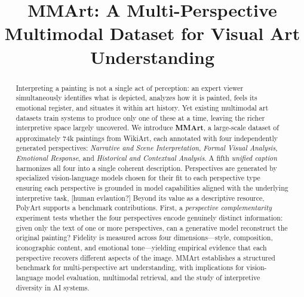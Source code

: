 \documentclass[sigconf,review,anonymous]{acmart}
\begin{document}
\title{MMArt: A Multi-Perspective Multimodal Dataset for Visual Art Understanding}

%




\renewcommand{\shortauthors}{Shuai Wang et al.}



\begin{abstract}
Interpreting a painting is not a single act of perception: an expert viewer simultaneously identifies what is depicted, analyzes how it is painted, feels its emotional register, and situates it within art history. Yet existing multimodal art datasets train systems to produce only one of these at a time, leaving the richer interpretive space largely uncovered. We introduce \textbf{MMArt}, a large-scale dataset of approximately 74k paintings from WikiArt, each annotated with four independently generated perspectives: \emph{Narrative and Scene Interpretation}, \emph{Formal Visual Analysis}, \emph{Emotional Response}, and \emph{Historical and Contextual Analysis}. A fifth \emph{unified caption} harmonizes all four into a single coherent description. Perspectives are generated by specialized vision-language models chosen for their fit to each perspective type ensuring each perspective is grounded in model capabilities aligned with the underlying interpretive task, [human evlaution?]
Beyond its value as a descriptive resource, PolyArt supports a benchmark contributions. First, a \emph{perspective complementarity} experiment tests whether the four perspectives encode genuinely distinct information: given only the text of one or more perspectives, can a generative model reconstruct the original painting? Fidelity is measured across four dimensions---style, composition, iconographic content, and emotional tone---yielding empirical evidence that each perspective recovers different aspects of the image. MMArt establishes a structured benchmark for multi-perspective art understanding, with implications for vision-language model evaluation, multimodal retrieval, and the study of interpretive diversity in AI systems.
\end{abstract}
\end{document}

